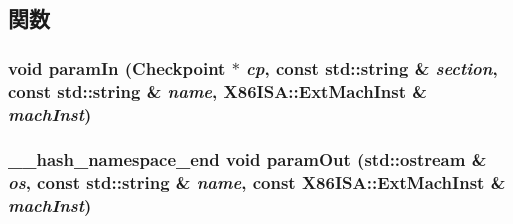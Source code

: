 \subsection{関数}
\hypertarget{arch_2x86_2types_8hh_a9b3a414227099849bc16482eceea5b20}{
\subsubsection[{paramIn}]{\setlength{\rightskip}{0pt plus 5cm}void paramIn ({\bf Checkpoint} $\ast$ {\em cp}, \/  const std::string \& {\em section}, \/  const std::string \& {\em name}, \/  {\bf X86ISA::ExtMachInst} \& {\em machInst})}}
\label{arch_2x86_2types_8hh_a9b3a414227099849bc16482eceea5b20}
\hypertarget{arch_2x86_2types_8hh_abd04feaf49e2ec8adbaa8f70d71f37a6}{
\subsubsection[{paramOut}]{\setlength{\rightskip}{0pt plus 5cm}\_\-\_\-hash\_\-namespace\_\-end void paramOut (std::ostream \& {\em os}, \/  const std::string \& {\em name}, \/  const {\bf X86ISA::ExtMachInst} \& {\em machInst})}}
\label{arch_2x86_2types_8hh_abd04feaf49e2ec8adbaa8f70d71f37a6}
